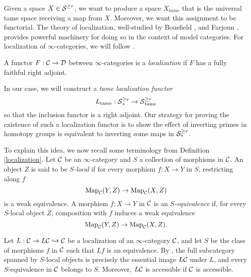     
Given a space $X\in \operatorname{\mathcal{S}}^{\geq r}$, we want to produce a space $X_{tame}$ that is the universal tame space receiving a map from $X$. Moreover, we want this assignment to be functorial. The theory of localization, well-studied by Bousfield \cite{BousfieldSpaces}, \cite{BousfieldSpectra} and Farjoun \cite{Farjoun}, provides powerful machinery for doing so in the context of model categories.
For localization of $\infty$-categories, we will follow \cite{HTT}.
\begin{definition}
    \cite[Definition 5.2.7.2.]{HTT}
    A functor $F:{\mathcal{C}}\to {\mathcal{D}}$ between $\infty$-categories is a \emph{localization} if $F$ has a fully faithful right adjoint.
\end{definition}
In our case, we will construct a \emph{tame localization functor}
$$
L_{\operatorname{\operatorname{tame}}}: \operatorname{\mathcal{S}}^{\geq r}_* \to \operatorname{\mathcal{S}}^{\geq r}_{\operatorname{\operatorname{tame}}}
$$
so that the inclusion functor is a right adjoint.
Our strategy for proving the existence of such a localization functor is to show the effect of inverting primes in homotopy groups is equivalent to inverting some maps in ${\mathcal{S}}^{\geq r}_{*}$.

To explain this idea, we now recall some terminology from Definition \ref{localization}. 
Let ${\mathcal{C}}$ be an $\infty$-category and $S$ a collection of morphisms in ${\mathcal{C}}$.
An object $Z$ is said to be \emph{$S$-local} if for every morphism $f:X\to Y$ in $S$, restricting along $f$ 
$$
\operatorname{Map}_{{\mathcal{C}}}(Y,Z) \to \operatorname{Map}_{{\mathcal{C}}}(X,Z)
$$
is a weak equivalence.
A morphism $f:X\to Y$ in ${\mathcal{C}}$ is an \emph{$S$-equivalence} if, for every $S$-local object $Z$, composition with $f$ induces a weak equivalence 
$$
\operatorname{Map}_{{\mathcal{C}}}(Y,Z) \to \operatorname{Map}_{{\mathcal{C}}}(X,Z).
$$
\begin{remark}
    Let $L:{\mathcal{C}} \to L{\mathcal{C}} \hookrightarrow {\mathcal{C}}$ be a localization of an $\infty$-category ${\mathcal{C}}$, and let $S$ be the class of morphisms $f$ in ${\mathcal{C}}$ such that $Lf$ is an equivalence.
    By \cite[Proposition 5.5.4.2.]{HTT}, the full subcategory spanned by $S$-local objects is precisely the essential image $L{\mathcal{C}}$ under $L$, and every $S$-equivalence in ${\mathcal{C}}$ belongs to $S$. Moreover,  $L{\mathcal{C}}$ is accessible if ${\mathcal{C}}$ is accessible.
\end{remark}

